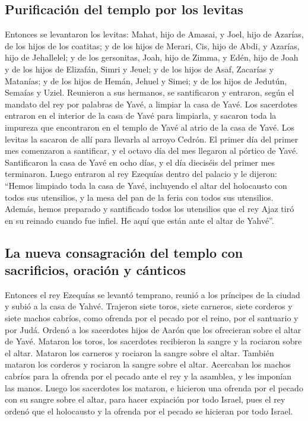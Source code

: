 \begin{paracol}{2}
{\subsection{Purificación del templo por los
levitas}\label{purificaciuxf3n-del-templo-por-los-levitas}}

 Entonces se levantaron los levitas: Mahat, hijo de
Amasai, y Joel, hijo de Azarías, de los hijos de los coatitas; y de los
hijos de Merari, Cis, hijo de Abdi, y Azarías, hijo de Jehallelel; y de
los gersonitas, Joah, hijo de Zimma, y Edén, hijo de Joah
 y de los hijos de Elizafán, Simri y Jeuel; y de los
hijos de Asaf, Zacarías y Matanías;  y de los hijos de
Hemán, Jehuel y Simei; y de los hijos de Jedutún, Semaías y Uziel.
 Reunieron a sus hermanos, se santificaron y entraron,
según el mandato del rey por palabras de Yavé, a limpiar la casa de
Yavé.  Los sacerdotes entraron en el interior de la casa
de Yavé para limpiarla, y sacaron toda la impureza que encontraron en el
templo de Yavé al atrio de la casa de Yavé. Los levitas la sacaron de
allí para llevarla al arroyo Cedrón.  El primer día del
primer mes comenzaron a santificar, y el octavo día del mes llegaron al
pórtico de Yavé. Santificaron la casa de Yavé en ocho días, y el día
dieciséis del primer mes terminaron.  Luego entraron al
rey Ezequías dentro del palacio y le dijeron: ``Hemos limpiado toda la
casa de Yavé, incluyendo el altar del holocausto con todos sus
utensilios, y la mesa del pan de la feria con todos sus utensilios.
 Además, hemos preparado y santificado todos los
utensilios que el rey Ajaz tiró en su reinado cuando fue infiel. He aquí
que están ante el altar de Yahvé''.

\hypertarget{la-nueva-consagraciuxf3n-del-templo-con-sacrificios-oraciuxf3n-y-cuxe1nticos}{%
\subsection{La nueva consagración del templo con sacrificios, oración y
cánticos}\label{la-nueva-consagraciuxf3n-del-templo-con-sacrificios-oraciuxf3n-y-cuxe1nticos}}

 Entonces el rey Ezequías se levantó temprano, reunió a
los príncipes de la ciudad y subió a la casa de Yahvé. 
Trajeron siete toros, siete carneros, siete corderos y siete machos
cabríos, como ofrenda por el pecado por el reino, por el santuario y por
Judá. Ordenó a los sacerdotes hijos de Aarón que los ofrecieran sobre el
altar de Yavé.  Mataron los toros, los sacerdotes
recibieron la sangre y la rociaron sobre el altar. Mataron los carneros
y rociaron la sangre sobre el altar. También mataron los corderos y
rociaron la sangre sobre el altar.  Acercaban los machos
cabríos para la ofrenda por el pecado ante el rey y la asamblea, y les
imponían las manos.  Luego los sacerdotes los mataron, e
hicieron una ofrenda por el pecado con su sangre sobre el altar, para
hacer expiación por todo Israel, pues el rey ordenó que el holocausto y
la ofrenda por el pecado se hicieran por todo Israel.


\end{paracol}
